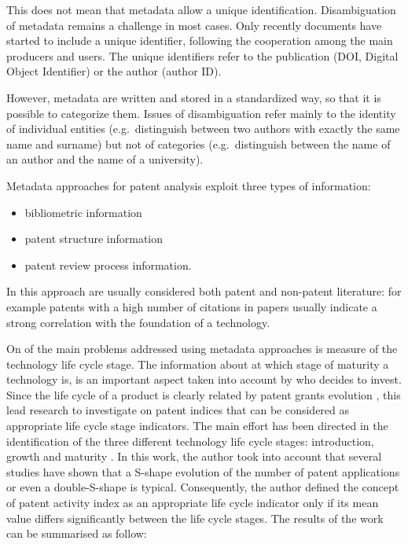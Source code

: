 \documentclass[b5paper,]{book}
\providecommand{\tightlist}{%
  \setlength{\itemsep}{0pt}\setlength{\parskip}{0pt}}
\theoremstyle{definition}
\theoremstyle{definition}
\theoremstyle{definition}
\theoremstyle{remark}
\begin{document}
This does not mean that metadata allow a unique identification.
Disambiguation of metadata remains a challenge in most cases. Only
recently documents have started to include a unique identifier,
following the cooperation among the main producers and users. The unique
identifiers refer to the publication (DOI, Digital Object Identifier) or
the author (author ID).

However, metadata are written and stored in a standardized way, so that
it is possible to categorize them. Issues of disambiguation refer mainly
to the identity of individual entities (e.g.~distinguish between two
authors with exactly the same name and surname) but not of categories
(e.g.~distinguish between the name of an author and the name of a
university).

Metadata approaches for patent analysis exploit three types of
information:

\begin{itemize}
\tightlist
\item
  bibliometric information
\item
  patent structure information
\item
  patent review process information.
\end{itemize}

In this approach are usually considered both patent and non-patent
literature: for example patents with a high number of citations in
papers usually indicate a strong correlation with the foundation of a
technology.

On of the main problems addressed using metadata approaches is measure
of the technology life cycle stage. The information about at which stage
of maturity a technology is, is an important aspect taken into account
by who decides to invest. Since the life cycle of a product is clearly
related by patent grants evolution \citep{andersen1999hunt}, this lead
research to investigate on patent indices that can be considered as
appropriate life cycle stage indicators. The main effort has been
directed in the identification of the three different technology life
cycle stages: introduction, growth and maturity \citep{haupt2007patent}.
In this work, the author took into account that several studies have
shown that a S-shape evolution of the number of patent applications or
even a double-S-shape is typical. Consequently, the author defined the
concept of patent activity index as an appropriate life cycle indicator
only if its mean value differs significantly between the life cycle
stages. The results of the work can be summarised as follow:
\end{document}
